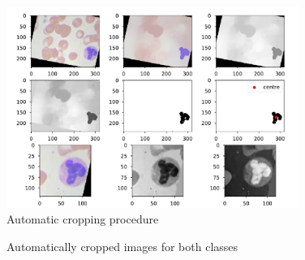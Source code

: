 \documentclass[10pt,a4paper]{article}
\begin{document}
\begin{figure}[!htb]
  \centering
  \includegraphics[width=0.85\textwidth]{Graphs/Find_center.pdf}
  \caption{Automatic cropping procedure}\label{find_centre}
\end{figure}


\begin{figure}[!htb]
  \centering
  \hfill
  \caption{Automatically cropped images for both classes}\label{cropped}
\end{figure}
\end{document}
